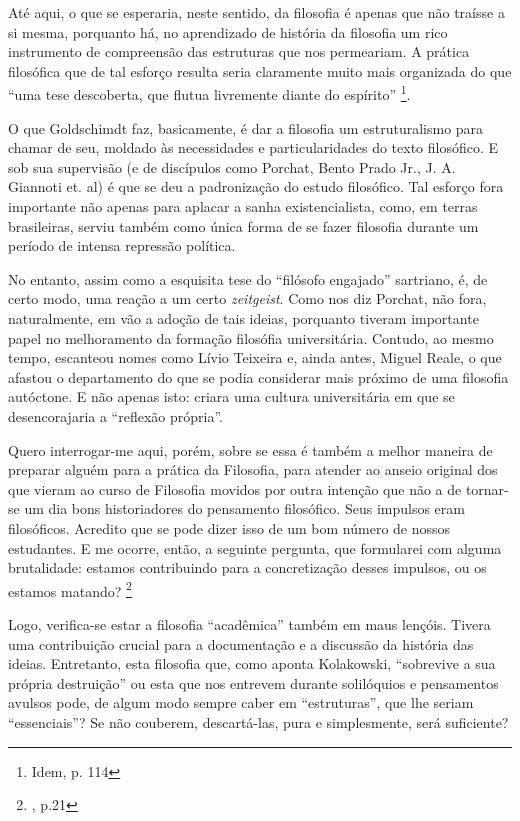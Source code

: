 \documentclass[12pt,a4paper]{article}
\newenvironment{citac}{
	\begin{addmargin}[4cm]{1em} \footnotesize}{\normalfont \end{addmargin}
}
\begin{document}
	Até aqui, o que se esperaria, neste sentido, da filosofia é apenas 
	que não traísse a si mesma, porquanto há, no aprendizado de história 
	da filosofia um rico instrumento de compreensão das estruturas que 
	nos permeariam. A prática filosófica que de tal esforço resulta 
	seria claramente muito mais organizada do que “uma tese descoberta, 
	que flutua livremente diante do espírito” \footnote{Idem, p. 114}. 

	O que Goldschimdt faz, basicamente, é dar a filosofia um 
	estruturalismo para chamar de seu, moldado às necessidades e 
	particularidades do texto filosófico. E sob sua supervisão 
	(e de discípulos como Porchat, Bento Prado Jr., J. A. Giannoti
	et. al) é que se deu a padronização do estudo filosófico. Tal 
	esforço fora importante não apenas para aplacar a sanha 
	existencialista, como, em terras brasileiras, serviu também 
	como única forma de se fazer filosofia durante um período de 
	intensa repressão política. 

	No entanto, assim como a esquisita tese do “filósofo engajado” 
	sartriano, é, de certo modo, uma reação a um certo \textit{zeitgeist}. 
	Como nos diz Porchat, não fora, naturalmente, em vão a adoção de tais 
	ideias, porquanto tiveram importante papel no melhoramento da formação 
	filosófia universitária. Contudo, ao mesmo tempo, escanteou nomes 
	como Lívio Teixeira e, ainda antes, Miguel Reale, o que afastou o 
	departamento do que se podia considerar mais próximo de uma filosofia 
	autóctone. E não apenas isto: criara uma cultura universitária em que 
	se desencorajaria a “reflexão própria”. 

	\begin{citac}
		Quero interrogar-me aqui, porém, sobre se essa é também a
		melhor maneira de preparar alguém para a prática da Filosofia, 
		para
		atender ao anseio original dos que vieram ao curso de Filosofia
		movidos por outra intenção que não a de tornar-se um dia bons
		historiadores do pensamento filosófico. Seus impulsos eram 
		filosóficos. Acredito que se pode dizer isso de um bom número 
		de nossos estudantes. E me ocorre, então, a seguinte pergunta, 
		que formularei com alguma brutalidade: estamos contribuindo 
		para a concretização desses impulsos, ou os estamos matando? 
		\footnote{\cite{porchat}, p.21}
	\end{citac}
	
	Logo, verifica-se estar a filosofia “acadêmica” também em maus lençóis. 
	Tivera uma contribuição crucial para a documentação e a discussão da 
	história das ideias. Entretanto, esta filosofia que, como aponta 
	Kolakowski, “sobrevive a sua própria destruição” ou esta que nos 
	entrevem durante solilóquios e pensamentos avulsos pode, de algum modo 
	sempre caber em “estruturas”, que lhe seriam “essenciais”? Se não 
	couberem, descartá-las, pura e simplesmente, será suficiente? 
	
\end{document}
